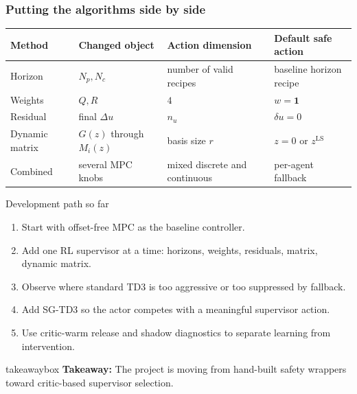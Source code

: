 \documentclass[aspectratio=169]{beamer}
\newcommand{\takeawaybox}[1]{%
\vspace{0.02cm}
\begin{center}
\begin{beamercolorbox}[wd=0.94\textwidth,sep=3pt,center,rounded=true,shadow=false]{takeawaybox}
\scriptsize
\textbf{\textcolor{maroon1}{Takeaway:}} #1
\end{beamercolorbox}
\end{center}
}
\begin{document}
\begin{frame}
\frametitle{\large \textbf{Putting the algorithms side by side}}
\scriptsize

\begin{center}
\tiny
\renewcommand{\arraystretch}{1.18}
\begin{tabular}{p{}p{}p{}p{}}
\toprule
\textbf{Method} & \textbf{Changed object} & \textbf{Action dimension} & \textbf{Default safe action}\\
\midrule
Horizon & \(N_p,N_c\) & number of valid recipes & baseline horizon recipe\\
Weights & \(Q,R\) & \(4\) & \(w=\mathbf{1}\)\\
Residual & final \(\Delta u\) & \(n_u\) & \(\delta u=0\)\\
Dynamic matrix & \(G(z)\) through \(M_i(z)\) & basis size \(r\) & \(z=0\) or \(z^{\mathrm{LS}}\)\\
Combined & several MPC knobs & mixed discrete and continuous & per-agent fallback\\
\bottomrule
\end{tabular}
\end{center}

\vspace{0.1cm}

\begin{block}{Development path so far}
\begin{enumerate}\justifying
  \setlength\itemsep{0.35ex}
  \item Start with offset-free MPC as the baseline controller.
  \item Add one RL supervisor at a time: horizons, weights, residuals, matrix, dynamic matrix.
  \item Observe where standard TD3 is too aggressive or too suppressed by fallback.
  \item Add SG-TD3 so the actor competes with a meaningful supervisor action.
  \item Use critic-warm release and shadow diagnostics to separate learning from intervention.
\end{enumerate}
\end{block}

\takeawaybox{The project is moving from hand-built safety wrappers toward critic-based supervisor selection.}
\end{frame}
\end{document}
